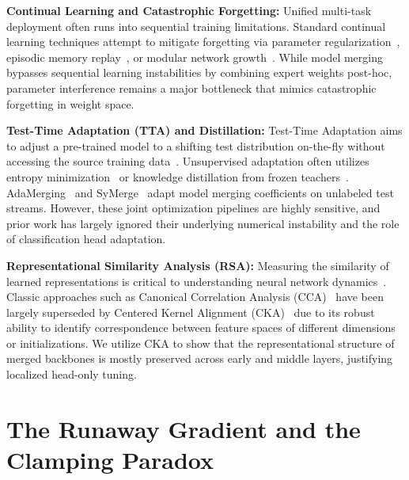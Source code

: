 \documentclass{article}
\theoremstyle{plain}
\theoremstyle{definition}
\theoremstyle{remark}
\begin{document}
\textbf{Continual Learning and Catastrophic Forgetting:} Unified multi-task deployment often runs into sequential training limitations. Standard continual learning techniques attempt to mitigate forgetting via parameter regularization~\cite{kirkpatrick2017overcoming}, episodic memory replay~\cite{lopezpaz2017gradient, buzzega2020dark}, or modular network growth~\cite{schwarz2018progress, lazaridou2020continual}. While model merging bypasses sequential learning instabilities by combining expert weights post-hoc, parameter interference remains a major bottleneck that mimics catastrophic forgetting in weight space.

\textbf{Test-Time Adaptation (TTA) and Distillation:} Test-Time Adaptation aims to adjust a pre-trained model to a shifting test distribution on-the-fly without accessing the source training data~\cite{wang2021tent, liang2020shot, zhang2022memo}. Unsupervised adaptation often utilizes entropy minimization~\cite{wang2021tent} or knowledge distillation from frozen teachers~\cite{hinton2015distilling, liang2020shot}. AdaMerging~\cite{yang2024adamerging} and SyMerge~\cite{symerge2026} adapt model merging coefficients on unlabeled test streams. However, these joint optimization pipelines are highly sensitive, and prior work has largely ignored their underlying numerical instability and the role of classification head adaptation.

\textbf{Representational Similarity Analysis (RSA):} Measuring the similarity of learned representations is critical to understanding neural network dynamics~\cite{yosinski2014how, neyshabur2020what}. Classic approaches such as Canonical Correlation Analysis (CCA)~\cite{raghu2017svcca, morcos2018insights} have been largely superseded by Centered Kernel Alignment (CKA)~\cite{kornblith2019similarity} due to its robust ability to identify correspondence between feature spaces of different dimensions or initializations. We utilize CKA to show that the representational structure of merged backbones is mostly preserved across early and middle layers, justifying localized head-only tuning.

\section{The Runaway Gradient and the Clamping Paradox}
\label{sec:deconstruction}
\end{document}

